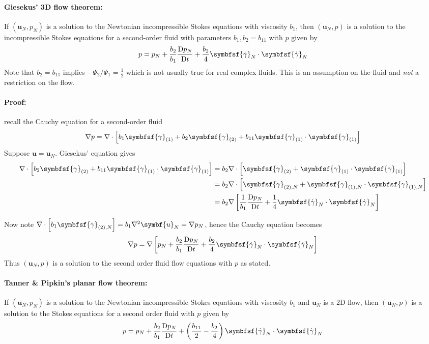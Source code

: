 \documentclass{jknotes}
\newcommand{\nsrate}[1]{\symbfsf{\gamma}_{(#1)}}
\newcommand{\Nsrate}[1]{\symbfsf{\gamma}_{(#1),N}}
\begin{document}
\paragraph{Giesekus' 3D flow theorem:}
If $(\symbf{u}_N, p_N)$ is a solution to the Newtonian incompressible Stokes
equations with viscosity $b_1$, then $(\symbf{u}_N, p)$ is a solution to the
incompressible Stokes equations for a second-order fluid with parameters $b_1,
b_2 = b_{11}$ with $p$ given by
\begin{equation}
	p = p_N + \frac{b_2}{b_1} \frac{\diffD p_N}{\diffD t} + \frac{b_2}{4}
	\symbfsf{\srate}_N \cdot \symbfsf{\srate}_N
\end{equation}
Note that $b_2 = b_{11}$ implies $-\Psi_2/\Psi_1 = \frac{1}{2}$ which is not
usually true for real complex fluids. This is an assumption on the fluid and
\emph{not} a restriction on the flow.

\paragraph{Proof:} recall the Cauchy equation for a second-order fluid
\begin{equation}
	\nabla p = \nabla \cdot \left[ b_1 \nsrate{1} + b_2 \nsrate{2} + b_{11}
	\nsrate{1}\cdot\nsrate{1}\right]
\end{equation}
Suppose $\symbf{u} = \symbf{u}_N$. Giesekus' equation gives
\begin{align}
	\nabla \cdot \left[b_2 \nsrate{2} + b_{11}
		\nsrate{1}\cdot\nsrate{1}\right] &= b_2 \nabla \cdot \left[ \nsrate{2}
	+ \nsrate{1} \cdot \nsrate{1}\right] \\
	&= b_2 \nabla \cdot \left[ \Nsrate{2} + \Nsrate{1}\cdot\Nsrate{1}\right]
	\\
	&= b_2 \nabla \left[ \inv{b_1} \frac{\diffD p_N}{\diffD t} + \frac{1}{4}
\symbfsf{\srate}_N \cdot \symbfsf{\srate}_N \right]
\end{align}

Now note $\nabla \cdot\left[ b_1 \Nsrate{2}\right] = b_1 \nabla^2 \symbf{u}_N
= \nabla p_N$, hence the Cauchy equation becomes
\begin{equation}
	\nabla p = \nabla \left[ p_N + \frac{b_2}{b_1} \frac{\diffD p_N}{\diffD t}
	+ \frac{b_2}{4} \symbfsf{\srate}_N \cdot \symbfsf{\srate}_N \right]
\end{equation}
Thus $(\symbf{u}_N, p)$ is a solution to the second order fluid flow equations
with $p$ as stated. \qedsymbol

\paragraph{Tanner \& Pipkin's planar flow theorem:} If $(\symbf{u}_N, p_N)$ is
a solution to the Newtonian incompressible Stokes equations with viscosity
$b_1$ and $\symbf{u}_N$ is a 2D flow, then $(\symbf{u}_N, p)$ is a solution to the Stokes
equations for a second order fluid with $p$ given by
\begin{equation}
	p = p_N + \frac{b_2}{b_1} \frac{\diffD p_N}{\diffD t} +
	\left(\frac{b_{11}}{2} - \frac{b_2}{4}\right) \symbfsf{\srate}_N \cdot
	\symbfsf{\srate}_N
\end{equation}
\end{document}
